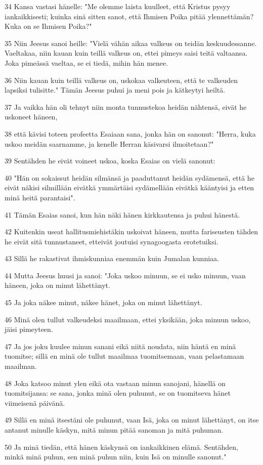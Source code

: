 \par 34 Kansa vastasi hänelle: "Me olemme laista kuulleet, että Kristus pysyy iankaikkisesti; kuinka sinä sitten sanot, että Ihmisen Poika pitää ylennettämän? Kuka on se Ihmisen Poika?"
\par 35 Niin Jeesus sanoi heille: "Vielä vähän aikaa valkeus on teidän keskuudessanne. Vaeltakaa, niin kauan kuin teillä valkeus on, ettei pimeys saisi teitä valtaansa. Joka pimeässä vaeltaa, se ei tiedä, mihin hän menee.
\par 36 Niin kauan kuin teillä valkeus on, uskokaa valkeuteen, että te valkeuden lapsiksi tulisitte." Tämän Jeesus puhui ja meni pois ja kätkeytyi heiltä.
\par 37 Ja vaikka hän oli tehnyt niin monta tunnustekoa heidän nähtensä, eivät he uskoneet häneen,
\par 38 että kävisi toteen profeetta Esaiaan sana, jonka hän on sanonut: "Herra, kuka uskoo meidän saarnamme, ja kenelle Herran käsivarsi ilmoitetaan?"
\par 39 Sentähden he eivät voineet uskoa, koska Esaias on vielä sanonut:
\par 40 "Hän on sokaissut heidän silmänsä ja paaduttanut heidän sydämensä, että he eivät näkisi silmillään eivätkä ymmärtäisi sydämellään eivätkä kääntyisi ja etten minä heitä parantaisi".
\par 41 Tämän Esaias sanoi, kun hän näki hänen kirkkautensa ja puhui hänestä.
\par 42 Kuitenkin useat hallitusmiehistäkin uskoivat häneen, mutta fariseusten tähden he eivät sitä tunnustaneet, etteivät joutuisi synagoogasta erotetuiksi.
\par 43 Sillä he rakastivat ihmiskunniaa enemmän kuin Jumalan kunniaa.
\par 44 Mutta Jeesus huusi ja sanoi: "Joka uskoo minuun, se ei usko minuun, vaan häneen, joka on minut lähettänyt.
\par 45 Ja joka näkee minut, näkee hänet, joka on minut lähettänyt.
\par 46 Minä olen tullut valkeudeksi maailmaan, ettei yksikään, joka minuun uskoo, jäisi pimeyteen.
\par 47 Ja jos joku kuulee minun sanani eikä niitä noudata, niin häntä en minä tuomitse; sillä en minä ole tullut maailmaa tuomitsemaan, vaan pelastamaan maailman.
\par 48 Joka katsoo minut ylen eikä ota vastaan minun sanojani, hänellä on tuomitsijansa: se sana, jonka minä olen puhunut, se on tuomitseva hänet viimeisenä päivänä.
\par 49 Sillä en minä itsestäni ole puhunut, vaan Isä, joka on minut lähettänyt, on itse antanut minulle käskyn, mitä minun pitää sanoman ja mitä puhuman.
\par 50 Ja minä tiedän, että hänen käskynsä on iankaikkinen elämä. Sentähden, minkä minä puhun, sen minä puhun niin, kuin Isä on minulle sanonut."

